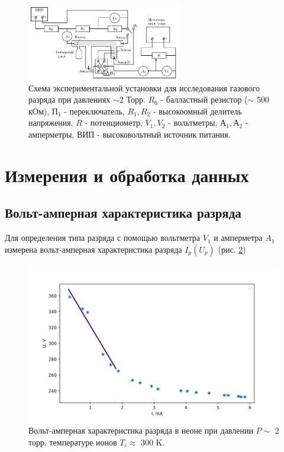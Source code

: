 \documentclass[a4paper,12pt]{article} %
\begin{document}
\begin{figure}[h!]
\begin{center}
\includegraphics[width=0.6\textwidth]{Установка}
\caption{Схема экспериментальной установки для исследования газового разряда при давлениях $\sim $2 Торр. $R_б$ - балластный резистор ($\sim $ 500 кОм), $П_1$ - переключатель, $R_1, R_2$ - высокоомный делитель напряжения, $R$ - потенциометр, $V_1, V_2$ - вольтметры, $А_1, А_2$ - амперметры, ВИП - высоковольтный источник питания.} \label{установка}
\end{center}
\end{figure}

\section{Измерения и обработка данных}
\subsection{Вольт-амперная характеристика разряда}
Для определения типа разряда с помощью вольтметра $V_1$ и амперметра $A_1$ измерена вольт-амперная характеристика разряда $I_p(U_p)$ (рис. \ref{ВАХ_разряда})

\begin{figure}[h!]
\begin{center}
\includegraphics[width=\textwidth]{U(I)_discharge}
\caption{Вольт-амперная характеристика разряда в неоне при давлении $P \sim$ 2 торр, температуре ионов $T_i \approx $ 300 K.} \label{ВАХ_разряда}
\end{center}
\end{figure}
\end{document}
